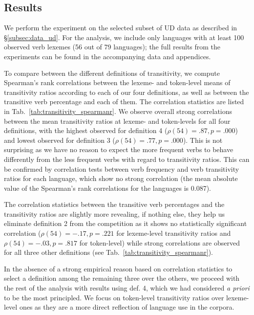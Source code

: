 \subsection{Results}



We perform the experiment on the selected subset of UD data as described in §\ref{subsec:data_ud}. For the analysis, we include only languages with at least 100 observed verb lexemes (56 out of 79 languages); the full results from the experiments can be found in the accompanying data and appendices. 

To compare between the different definitions of transitivity, we compute Spearman's rank correlations between the lexeme- and token-level means of transitivity ratios according to each of our four definitions, as well as between the transitive verb percentage and each of them. The correlation statistics are listed in Tab.~\ref{tab:transitivity_spearmanr}. We observe overall strong correlations between the mean transitivity ratios at lexeme- and token-levels for all four definitions, with the highest observed for definition 4 ($\rho(54)=.87, p=.000$) and lowest observed for definition 3 ($\rho(54)=.77, p=.000$). This is not surprising as we have no reason to expect the more frequent verbs to behave differently from the less frequent verbs with regard to transitivity ratios. This can be confirmed by correlation tests between verb frequency and verb transitivity ratios for each language, which show no strong correlation (the mean absolute value of the Spearman's rank correlations for the languages is 0.087).

The correlation statistics between the transitive verb percentages and the transitivity ratios are slightly more revealing, if nothing else, they help us eliminate definition 2 from the competition as it shows no statistically significant correlation ($\rho(54)=-.17, p=.221$ for lexeme-level transitivity ratios and $\rho(54)=-.03, p=.817$ for token-level) while strong correlations are observed for all three other definitions (see Tab.~\ref{tab:transitivity_spearmanr}).

In the absence of a strong empirical reason based on correlation statistics to select a definition among the remaining three over the others, we proceed with the rest of the analysis with results using def. 4, which we had considered \textit{a priori} to be the most principled. We focus on token-level transitivity ratios over lexeme-level ones as they are a more direct reflection of language use in the corpora.

